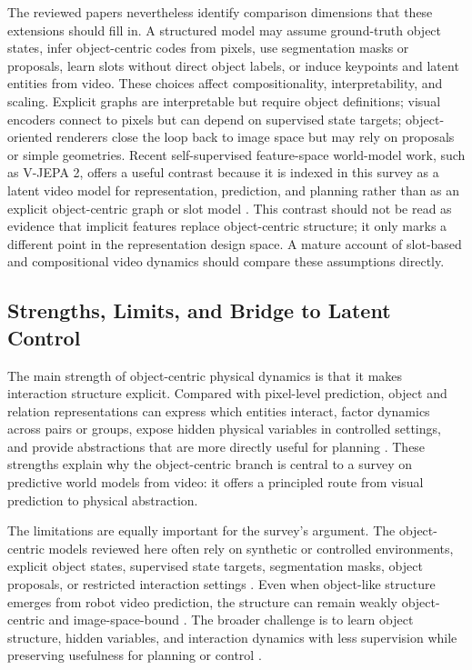 The reviewed papers nevertheless identify comparison dimensions that these extensions should fill in. A structured model may assume ground-truth object states, infer object-centric codes from pixels, use segmentation masks or proposals, learn slots without direct object labels, or induce keypoints and latent entities from video. These choices affect compositionality, interpretability, and scaling. Explicit graphs are interpretable but require object definitions; visual encoders connect to pixels but can depend on supervised state targets; object-oriented renderers close the loop back to image space but may rely on proposals or simple geometries. Recent self-supervised feature-space world-model work, such as V-JEPA 2, offers a useful contrast because it is indexed in this survey as a latent video model for representation, prediction, and planning rather than as an explicit object-centric graph or slot model \cite{assran2025vjepa2_prov}. This contrast should not be read as evidence that implicit features replace object-centric structure; it only marks a different point in the representation design space. A mature account of slot-based and compositional video dynamics should compare these assumptions directly.

\subsection{Strengths, Limits, and Bridge to Latent Control}

The main strength of object-centric physical dynamics is that it makes interaction structure explicit. Compared with pixel-level prediction, object and relation representations can express which entities interact, factor dynamics across pairs or groups, expose hidden physical variables in controlled settings, and provide abstractions that are more directly useful for planning \cite{battaglia2016_interaction_networks_prov,watters2017_visual_interaction_networks_prov,janner2019_o2p2_prov}. These strengths explain why the object-centric branch is central to a survey on predictive world models from video: it offers a principled route from visual prediction to physical abstraction.

The limitations are equally important for the survey's argument. The object-centric models reviewed here often rely on synthetic or controlled environments, explicit object states, supervised state targets, segmentation masks, object proposals, or restricted interaction settings \cite{battaglia2016_interaction_networks_prov,watters2017_visual_interaction_networks_prov,janner2019_o2p2_prov}. Even when object-like structure emerges from robot video prediction, the structure can remain weakly object-centric and image-space-bound \cite{finn2016_physical_interaction_video_prediction_prov}. The broader challenge is to learn object structure, hidden variables, and interaction dynamics with less supervision while preserving usefulness for planning or control \cite{finn2016_physical_interaction_video_prediction_prov,battaglia2016_interaction_networks_prov,watters2017_visual_interaction_networks_prov,janner2019_o2p2_prov,bruce2024_genie_prov}.

